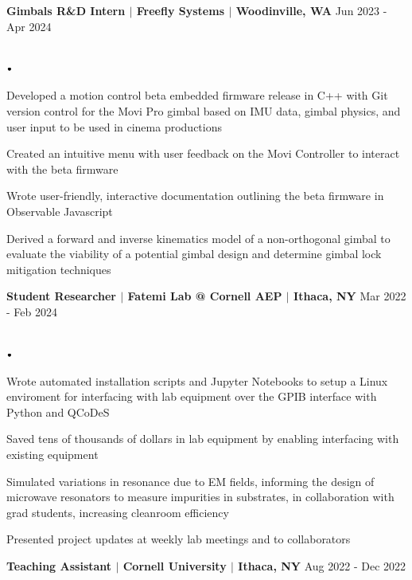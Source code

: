 \documentclass[11pt]{article}
\newcommand{\lbt}{\,\begin{picture}(-1,1)(-1,-3)\circle*{3}\end{picture}\ }
\newenvironment{achievements}{
    \begin{list}{$\lbt$}{
        \topsep -1pt
        \itemsep -1pt
        \addtolength{\leftmargin}{-0.15in}
    }
}
{
    \vspace*{0pt}
    \end{list}
}
\newcommand{\schoolwithcourses}[3]{
 \textbf{#1} \hfill{#2}\\
    \if\relax\detokenize{#3}\relax\else#3\\\fi
\vspace*{3pt}
}
\begin{document}
\schoolwithcourses{Gimbals R\&D Intern $\vert$ Freefly Systems $\vert$ Woodinville, WA}{Jun 2023 - Apr 2024}
{}

\vspace{-2mm}
\begin{achievements}

\item Developed a motion control beta embedded firmware release in C++ with Git version control for the Movi Pro gimbal based on IMU data, gimbal physics, and user input to be used in cinema productions
\item Created an intuitive menu with user feedback on the Movi Controller to interact with the beta firmware
\item Wrote user-friendly, interactive documentation outlining the beta firmware in Observable Javascript
\item Derived a forward and inverse kinematics model of a non-orthogonal gimbal to evaluate the viability of a potential gimbal design and determine gimbal lock mitigation techniques

\end{achievements}

\schoolwithcourses{Student Researcher $\vert$ Fatemi Lab @ Cornell AEP $\vert$ Ithaca, NY}{Mar 2022 - Feb 2024}{}

\vspace{-2mm}
\begin{achievements}
\item Wrote automated installation scripts and Jupyter Notebooks to setup a Linux enviroment for interfacing with lab equipment over the GPIB interface with Python and QCoDeS
\item Saved tens of thousands of dollars in lab equipment by enabling interfacing with existing equipment
\item Simulated variations in resonance due to EM fields, informing the design of microwave resonators to measure impurities in substrates, in collaboration with grad students, increasing cleanroom efficiency
\item Presented project updates at weekly lab meetings and to collaborators
\end{achievements}

\schoolwithcourses{Teaching Assistant $\vert$ Cornell University $\vert$ Ithaca, NY}{Aug 2022 - Dec 2022}{}
\end{document}
